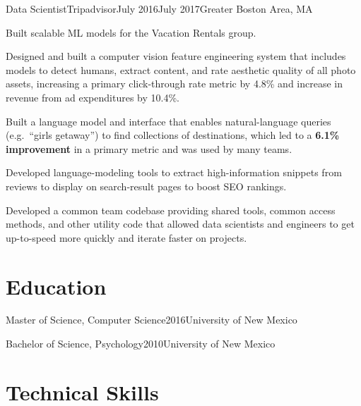 \documentclass[print]{ag-cv} %
\begin{document}
\begin{job}
  {}{Data Scientist}{Tripadvisor}{July 2016}{July 2017}{Greater Boston Area, MA}{
    Built scalable ML models for the Vacation Rentals group.
    \begin{myitemize}
      \item Designed and built a computer vision feature engineering system that
      includes models to detect humans, extract content, and rate aesthetic
      quality of all photo assets, increasing a primary click-through rate
      metric by 4.8\% and increase in revenue from ad expenditures by 10.4\%.

      \item Built a language model and interface that enables natural-language queries (e.g.\ ``girls getaway'') to find
      collections of destinations, which led to a \textbf{6.1\% improvement} in a primary metric and was
      used by many teams.

      \item Developed language-modeling tools to extract high-information snippets from reviews to display on
      search-result pages to boost SEO rankings.

      \item Developed a common team codebase providing shared tools, common access methods, and other utility
      code that allowed data scientists and engineers to get up-to-speed more quickly and iterate
      faster on projects.
    \end{myitemize}
  }
\end{job}


\section*{Education}
\begin{edu}{Master of Science, Computer Science}{2016}{University of New Mexico}
\end{edu}
\begin{edu}{Bachelor of Science, Psychology}{2010}{University of New Mexico}
\end{edu}

\section*{Technical Skills}
\end{document}
